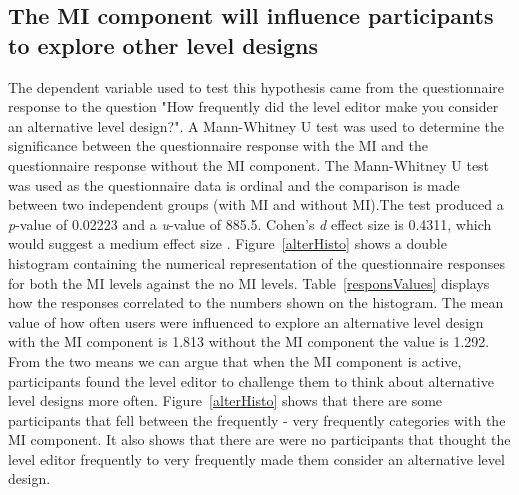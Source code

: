 \documentclass[journal]{IEEEtran}
\begin{document}
\subsection{The MI component will influence participants to explore other level designs}\label{alter}
The dependent variable used to test this hypothesis came from the questionnaire response to the question "How frequently did the level editor make you consider an alternative level design?". A Mann-Whitney U \cite{mann1947test} test was used to determine the significance between the questionnaire response with the MI and the questionnaire response without the MI component. The Mann-Whitney U test was used as the questionnaire data is ordinal and the comparison is made between two independent groups (with MI and without MI).The test produced a \textit{p}-value of 0.02223 and a \textit{u}-value of 885.5. Cohen's \textit{d} effect size is 0.4311, which would suggest a medium effect size \cite{cohen1988statistical}. Figure~\ref{alterHisto} shows a double histogram containing the numerical representation of the questionnaire responses for both the MI levels against the no MI levels. Table~\ref{responsValues} displays how the responses correlated to the numbers shown on the histogram. The mean value of how often users were influenced to explore an alternative level design with the MI component is 1.813 without the MI component the value is 1.292. From the two means we can argue that when the MI component is active, participants found the level editor to challenge them to think about alternative level designs more often. Figure~\ref{alterHisto} shows that there are some participants that fell between the frequently - very frequently categories with the MI component. It also shows that there are were no participants that thought the level editor frequently to very frequently made them consider an alternative level design.  
\end{document}
